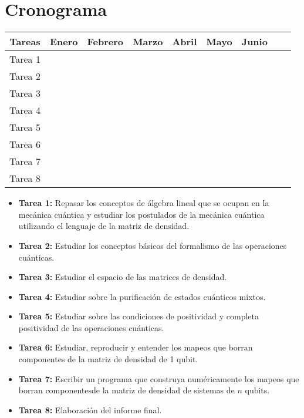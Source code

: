 \documentclass[11pt, spanish, letterpage]{article} %
\begin{document}
\section{Cronograma} %
\begin{center}
\begingroup
\setlength{\tabcolsep}{10pt} %
\renewcommand{\arraystretch}{1.2} %
\begin{tabular}{|c|c|c|c|c|c|c|c|c|}
\hline
\textbf{Tareas} & \textbf{Enero} & \textbf{Febrero} & \textbf{Marzo} & \textbf{Abril} & \textbf{Mayo} & \textbf{Junio} \\ \hline
Tarea 1 & \cellcolor[gray]{0.5} &  &  &  &  &	\\ \hline
Tarea 2 & \cellcolor[gray]{0.5} & & & & &	\\ \hline
Tarea 3 & & \cellcolor[gray]{0.5} & & & &	\\ \hline
Tarea 4 & & \cellcolor[gray]{0.5} & & & &	\\ \hline
Tarea 5 & & & \cellcolor[gray]{0.5} & & &	\\ \hline
Tarea 6 & & & \cellcolor[gray]{0.5} & & &	\\ \hline
Tarea 7 & & & \cellcolor[gray]{0.5} & \cellcolor[gray]{0.5} & \cellcolor[gray]{0.5} &	\\ \hline
Tarea 8 & & & & & & \cellcolor[gray]{0.5}	\\ \hline
\end{tabular}
\endgroup
\end{center}

\begin{itemize}
	\item \textbf{Tarea 1:} Repasar los conceptos de álgebra lineal que se ocupan
	en la mecánica cuántica y estudiar los postulados de la mecánica cuántica 
	utilizando el lenguaje de la matriz de densidad.
	\item \textbf{Tarea 2:} Estudiar los conceptos básicos del formalismo de las
	operaciones cuánticas.
	\item \textbf{Tarea 3:} Estudiar el espacio de las matrices de densidad.
	\item \textbf{Tarea 4:} Estudiar sobre la purificación de estados cuánticos mixtos.
	\item \textbf{Tarea 5:} Estudiar sobre las condiciones de positividad y completa
	positividad de las operaciones cuánticas.
	\item \textbf{Tarea 6:} Estudiar, reproducir y entender los mapeos que borran 
	componentes de la matriz de densidad de 1 qubit.
	\item \textbf{Tarea 7:} Escribir un programa que construya numéricamente los mapeos
	que borran componentesde la matriz de densidad de sistemas de $n$ qubits.
	\item \textbf{Tarea 8:} Elaboración del informe final. 
\end{itemize}



\end{document}
